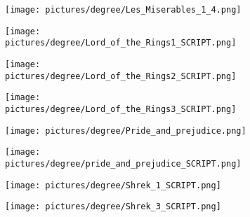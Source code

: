 \begin{figure} \ContinuedFloat
        \centering
        \begin{subfigure}{.49\textwidth}
                \centering
                \texttt{[image: pictures/degree/Les\_Miserables\_1\_4.png]}
        \end{subfigure}
        \begin{subfigure}{.49\textwidth}
                \centering
                \texttt{[image: pictures/degree/Lord\_of\_the\_Rings1\_SCRIPT.png]}
        \end{subfigure}
\end{figure}
\begin{figure} \ContinuedFloat
        \centering
        \begin{subfigure}{.49\textwidth}
                \centering
                \texttt{[image: pictures/degree/Lord\_of\_the\_Rings2\_SCRIPT.png]}
        \end{subfigure}
        \begin{subfigure}{.49\textwidth}
                \centering
                \texttt{[image: pictures/degree/Lord\_of\_the\_Rings3\_SCRIPT.png]}
        \end{subfigure}
\end{figure}
\begin{figure} \ContinuedFloat
        \centering
        \begin{subfigure}{.49\textwidth}
                \centering
                \texttt{[image: pictures/degree/Pride\_and\_prejudice.png]}
        \end{subfigure}
        \begin{subfigure}{.49\textwidth}
                \centering
                \texttt{[image: pictures/degree/pride\_and\_prejudice\_SCRIPT.png]}
        \end{subfigure}
\end{figure}
\begin{figure} \ContinuedFloat
        \centering
        \begin{subfigure}{.49\textwidth}
                \centering
                \texttt{[image: pictures/degree/Shrek\_1\_SCRIPT.png]}
        \end{subfigure}
        \begin{subfigure}{.49\textwidth}
                \centering
                \texttt{[image: pictures/degree/Shrek\_3\_SCRIPT.png]}
        \end{subfigure}
\end{figure}
